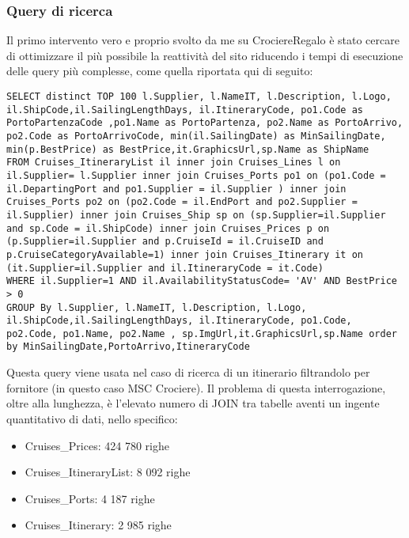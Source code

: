 \subsubsection{Query di ricerca}
Il primo intervento vero e proprio svolto da me su CrociereRegalo è stato cercare di ottimizzare il più possibile la reattività del sito riducendo i tempi di esecuzione delle query più complesse, come quella riportata qui di seguito:
\begin{lstlisting}
SELECT distinct TOP 100 l.Supplier, l.NameIT, l.Description, l.Logo, il.ShipCode,il.SailingLengthDays, il.ItineraryCode, po1.Code as PortoPartenzaCode ,po1.Name as PortoPartenza, po2.Name as PortoArrivo, po2.Code as PortoArrivoCode, min(il.SailingDate) as MinSailingDate, min(p.BestPrice) as BestPrice,it.GraphicsUrl,sp.Name as ShipName 
FROM Cruises_ItineraryList il inner join Cruises_Lines l on il.Supplier= l.Supplier inner join Cruises_Ports po1 on (po1.Code = il.DepartingPort and po1.Supplier = il.Supplier ) inner join Cruises_Ports po2 on (po2.Code = il.EndPort and po2.Supplier = il.Supplier) inner join Cruises_Ship sp on (sp.Supplier=il.Supplier and sp.Code = il.ShipCode) inner join Cruises_Prices p on (p.Supplier=il.Supplier and p.CruiseId = il.CruiseID and p.CruiseCategoryAvailable=1) inner join Cruises_Itinerary it on (it.Supplier=il.Supplier and il.ItineraryCode = it.Code) 
WHERE il.Supplier=1 AND il.AvailabilityStatusCode= 'AV' AND BestPrice > 0 
GROUP By l.Supplier, l.NameIT, l.Description, l.Logo, il.ShipCode,il.SailingLengthDays, il.ItineraryCode, po1.Code, po2.Code, po1.Name, po2.Name , sp.ImgUrl,it.GraphicsUrl,sp.Name order by MinSailingDate,PortoArrivo,ItineraryCode
\end{lstlisting}
Questa query viene usata nel caso di ricerca di un itinerario filtrandolo per fornitore (in questo caso MSC Crociere). Il problema di questa interrogazione, oltre alla lunghezza, è l'elevato numero di JOIN tra tabelle aventi un ingente quantitativo di dati, nello specifico:
\begin{itemize}
	\item Cruises\_Prices: 424 780 righe
	\item Cruises\_ItineraryList: 8 092 righe
	\item Cruises\_Ports: 4 187 righe
	\item Cruises\_Itinerary: 2 985 righe
\end{itemize}

